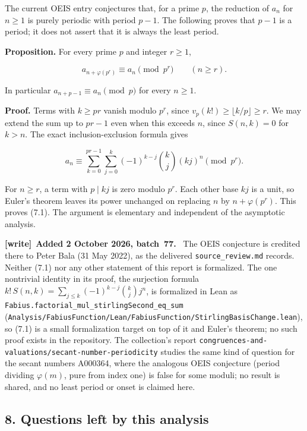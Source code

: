 \documentclass[11pt,letterpaper]{article}
\newenvironment{writenote}[1][]{\par\smallskip\begingroup\small
 \noindent\textbf{[write]}\if\relax\detokenize{#1}\relax\else~\textbf{#1.}\fi\ }%
 {\par\endgroup\smallskip}
\numberwithin{equation}{subsection}
\theoremstyle{definition}
\theoremstyle{remark}
\theoremstyle{plain}
\begin{document}
The current OEIS entry conjectures that, for a prime \(p\), the reduction of \(a_n\) for \(n\ge1\) is purely periodic with period \(p-1\). The following proves that \(p-1\) is a period; it does not assert that it is always the least period.

\textbf{Proposition.} For every prime \(p\) and integer \(r\ge1\),

\[
 a_{n+\varphi(p^r)}\equiv a_n\pmod{p^r}\qquad(n\ge r).\tag{7.1}
\]

In particular \(a_{n+p-1}\equiv a_n\pmod p\) for every \(n\ge1\).

\textbf{Proof.} Terms with \(k\ge pr\) vanish modulo \(p^r\), since \(v_p(k!)\ge\lfloor k/p\rfloor\ge r\). We may extend the sum up to \(pr-1\) even when this exceeds \(n\), since \(S(n,k)=0\) for \(k>n\). The exact inclusion-exclusion formula gives

\[
 a_n\equiv\sum_{k=0}^{pr-1}\sum_{j=0}^k
 (-1)^{k-j}\binom{k}{j}(kj)^n\pmod{p^r}.
\]

For \(n\ge r\), a term with \(p\mid kj\) is zero modulo \(p^r\). Each other base \(kj\) is a unit, so Euler's theorem leaves its power unchanged on replacing \(n\) by \(n+\varphi(p^r)\). This proves (7.1). The argument is elementary and independent of the asymptotic analysis.

\begin{writenote}[Added 2 October 2026, batch~77]
The OEIS conjecture is credited there to Peter Bala (31 May 2022), as the
delivered \nolinkurl{source_review.md} records. Neither (7.1) nor any other
statement of this report is formalized. The one nontrivial identity in its
proof, the surjection formula \(k!\,S(n,k)=\sum_{j\le k}(-1)^{k-j}\binom kj
j^n\), is formalized in Lean as
\texttt{Fabius.factorial\_mul\_stirlingSecond\_eq\_sum}
(\nolinkurl{Analysis/FabiusFunction/Lean/FabiusFunction/StirlingBasisChange.lean}),
so (7.1) is a small formalization target on top of it and Euler's theorem;
no such proof exists in the repository. The collection's report
\nolinkurl{congruences-and-valuations/secant-number-periodicity} studies the
same kind of question for the secant numbers A000364, where the analogous
OEIS conjecture (period dividing \(\varphi(m)\), pure from index one) is
false for some moduli; no result is shared, and no least period or onset is
claimed here.
\end{writenote}

\subsection{8. Questions left by this analysis}\label{a122:questions-left-by-this-analysis}
\end{document}
